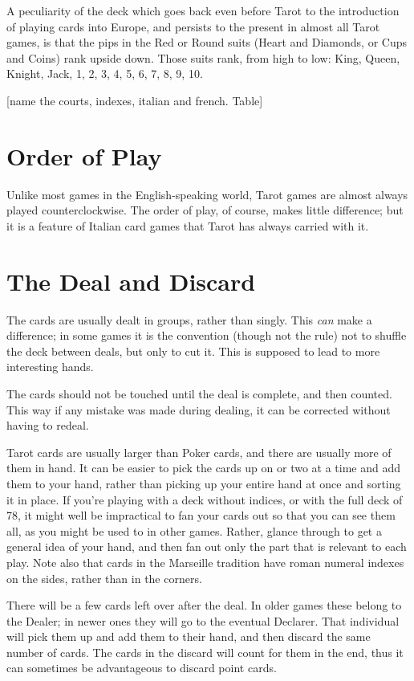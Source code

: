\documentclass[ebook,12pt,twoside,openright,extrafontsizes,final]{memoir}
\begin{document}
A peculiarity of the deck which goes back even before Tarot to the introduction
of playing cards into Europe, and persists to the present in almost all Tarot
games, is that the pips in the Red or Round suits (Heart and Diamonds, or Cups
and Coins) rank upside down.  Those suits rank, from high to low: King, Queen,
Knight, Jack, 1, 2, 3, 4, 5, 6, 7, 8, 9, 10.

  

[name the courts, indexes, italian and french. Table]

\section{Order of Play}
Unlike most games in the English-speaking world, Tarot games are almost always
played counterclockwise.  The order of play, of course, makes little 
difference; but it is a feature of Italian card games that Tarot has always 
carried with it.

\section{The Deal and Discard}
The cards are usually dealt in groups, rather than singly. This \emph{can} make
a difference; in some games it is the convention (though not the rule) not to
shuffle the deck between deals, but only to cut it. This is supposed to lead
to more interesting hands.

The cards should not be touched until the deal is complete, and then counted.
This way if any mistake was made during dealing, it can be corrected without
having to redeal.

Tarot cards are usually larger than Poker cards, and there are usually more of 
them in hand.  It can be easier to pick the cards up on or two at a time and 
add them to your hand, rather than picking up your entire hand at once and sorting
it in place.  If you're playing with a deck without indices, or with the full 
deck of 78, it might well be impractical to fan your cards out so that you can 
see them all, as you might be used to in other games. Rather, glance through to
get a general idea of your hand, and then fan out only the part that is relevant
to each play. Note also that cards in the Marseille tradition have roman numeral
indexes on the sides, rather than in the corners.

There will be a few cards left over after the deal.  In older games these belong
to the Dealer; in newer ones they will go to the eventual Declarer. That
individual will pick them up and add them to their hand, and then discard 
the same number of cards. The cards in the discard will count for them in the 
end, thus it can sometimes be advantageous to discard point cards.
\end{document}
